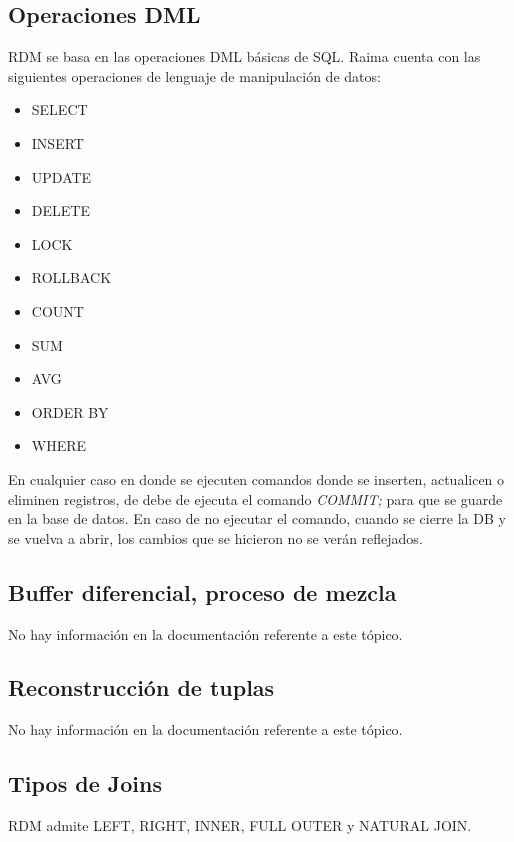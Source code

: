 \documentclass{acmart}
\begin{document}
\subsection{Operaciones DML}
RDM se basa en las operaciones DML básicas de SQL.
Raima cuenta con las siguientes operaciones de lenguaje de manipulación de datos:\par
\begin{itemize}
    \item SELECT\par
	\item INSERT\par
	\item UPDATE\par
	\item DELETE\par
	\item LOCK\par
	\item ROLLBACK\par
	\item COUNT\par
	\item SUM\par
	\item AVG\par
	\item ORDER BY\par
	\item WHERE\par
\end{itemize}

En cualquier caso en donde se ejecuten comandos donde se inserten, actualicen o eliminen registros, de debe de ejecuta el comando \textit{COMMIT;} para que se guarde en la base de datos. En caso de no ejecutar el comando, cuando se cierre la DB y se vuelva a abrir, los cambios que se hicieron no se verán reflejados. \cite{Rsql, Rsort}
\subsection{Buffer diferencial, proceso de mezcla}
No hay información en la documentación referente a este tópico.
\subsection{Reconstrucción de tuplas}
No hay información en la documentación referente a este tópico.
\subsection{Tipos de Joins}
RDM admite LEFT, RIGHT, INNER, FULL OUTER y NATURAL JOIN. \cite{Rjoin}
\end{document}
